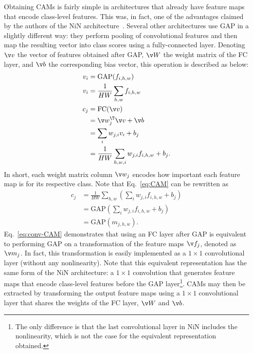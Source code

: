 Obtaining CAMs is fairly simple in architectures that already have feature maps that encode class-level features. This was, in fact, one of the advantages claimed by the authors of the NiN architecture~\cite{lin2013network}. Several other architectures use GAP in a slightly different way: they perform pooling of convolutional features and then map the resulting vector into class scores using a fully-connected layer. Denoting $\v v$ the vector of features obtained after GAP, $\v W$ the weight matrix of the FC layer, and $\v b$ the corresponding bias vector, this operation is described as below:
\begin{equation}\label{eq:CAM}
\begin{split}
v_i &= \text{GAP}(f_{i, h, w})\\
v_i &= \frac{1}{HW}\sum_{h,w}f_{i, h, w}\\
c_j &= \text{FC}(\v v)\\
&= \v w^\T_{j}\v v + \v b\\
&= \sum_{i} w_{j,i}v_{i} + b_j\\
&= \frac{1}{HW}\sum_{h,w,i}w_{j,i}f_{i, h, w} + b_j.
\end{split}
\end{equation}
In short, each weight matrix column $\v w_j$ encodes how important each feature map is for its respective class. Note that Eq.~\ref{eq:CAM} can be rewritten as
\begin{equation}\label{eq:conv-CAM}
\begin{split}
c_j &= \frac{1}{HW}\sum_{h,w}\left(\sum_{i}w_{j,i}f_{i,h,w} + b_j\right)\\
&= \text{GAP}\left(\sum_{i}w_{j,i}f_{i,h,w} + b_j\right)\\
&= \text{GAP}(m_{j,h,w}).
\end{split}
\end{equation}
Eq.~\ref{eq:conv-CAM} demonstrates that using an FC layer after GAP is equivalent to performing GAP on a transformation of the feature maps $\v f_j$, denoted as $\v m_{j}$. In fact, this transformation is easily implemented as a $1\times 1$ convolutional layer (without any nonlinearity). Note that this equivalent representation has the same form of the NiN architecture: a $1\times 1$ convolution that generates feature maps that encode class-level features before the GAP layer\footnote{The only difference is that the last convolutional layer in NiN includes the nonlinearity, which is not the case for the equivalent representation obtained.}. CAMs may then be extracted by transforming the output feature maps using a $1\times 1$ convolutional layer that shares the weights of the FC layer, $\v W$ and $\v b$.

